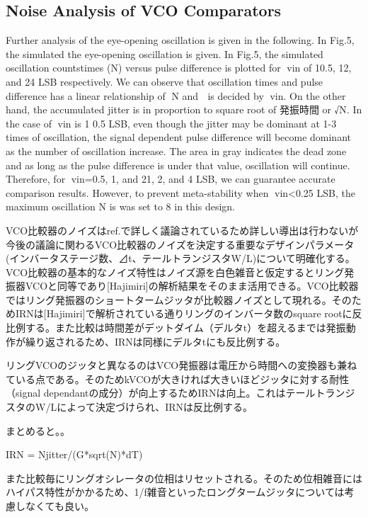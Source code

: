 \documentclass[letterpaper, 10 pt, conference]{ieeeconf}  %
\begin{document}
\subsection{Noise Analysis of VCO Comparators}
Further analysis of the eye-opening oscillation is given in the following. In Fig.5, the simulated the eye-opening oscillation is given. In Fig.5, the simulated oscillation countstimes (N) versus pulse difference is plotted for vin of 10.5, 12, and 24 LSB respectively. We can observe that oscillation times and pulse difference has a linear relationship of N and  is decided by vin. On the other hand, the accumulated jitter is in proportion to square root of 発振時間 or √N\cite{hajimiri1999jitter}\cite{abidi2006phase}. In the case of vin is 1 0.5 LSB, even though the jitter may be dominant at 1-3 times of oscillation, the signal dependent pulse difference will become dominant as the number of oscillation increase. The area in gray indicates the dead zone and as long as the pulse difference is under that value, oscillation will continue. Therefore, for vin=0.5, 1, and 21, 2, and 4 LSB, we can guarantee accurate comparison results. However, to prevent meta-stability when vin<0.25 LSB, the maximum oscillation N is was set to 8 in this design.

VCO比較器のノイズはref.\cite{luo2020input}で詳しく議論されているため詳しい導出は行わないが今後の議論に関わるVCO比較器のノイズを決定する重要なデザインパラメータ(インバータステージ数、⊿t、テールトランジスタW/L)について明確化する。VCO比較器の基本的なノイズ特性はノイズ源を白色雑音と仮定するとリング発振器VCOと同等であり[Hajimiri]の解析結果をそのまま活用できる。VCO比較器ではリング発振器のショートタームジッタが比較器ノイズとして現れる。そのためIRNは[Hajimiri]で解析されている通りリングのインバータ数のsquare rootに反比例する。また比較は時間差がデットダイム（デルタt）を超えるまでは発振動作が繰り返されるため、IRNは同様にデルタtにも反比例する。

リングVCOのジッタと異なるのはVCO発振器は電圧から時間への変換器も兼ねている点である。そのためkVCOが大きければ大きいほどジッタに対する耐性（signal dependantの成分）が向上するためIRNは向上。これはテールトランジスタのW/Lによって決定づけられ、IRNは反比例する。

まとめると。。

IRN = Njitter/(G*sqrt(N)*dT)

また比較毎にリングオシレータの位相はリセットされる。そのため位相雑音にはハイパス特性がかかるため、1/f雑音といったロングタームジッタについては考慮しなくても良い。
\end{document}

